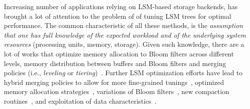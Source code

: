
 Increasing number of applications relying on LSM-based storage
    backends, has brought a lot of attention to the problem of  of tuning LSM trees for optimal performance.     
The common characteristic of all these methods, is the \emph{assumption that one has full knowledge of
the expected workload and of
the underlying system 
    resources} (processing units, memory, storage).
    Given such knowledge, there are a lot of works that optimize memory allocation to Bloom filters across different levels, 
memory distribution between buffers and Bloom filters and merging policies (i.e.,  \emph{leveling} or \emph{tiering})~\cite{Dayan2017,Dayan2018a}.  
Further LSM optimization efforts have lead to
hybrid merging policies to allow for more fine-grained 
tunings~\cite{Dayan2018,Dayan2019,Idreos2019}, optimized memory allocation 
strategies~\cite{Bortnikov2018,Kim2020,Luo2020a}, variations of Bloom 
filters~\cite{Luo2020,Zhang2018a,Zhang2020a}, new compaction 
routines~\cite{Alkowaileet2020,Luo2019a,Sarkar2020,Zhang2020}, and
exploitation of data characteristics~\cite{Yang2020, Ren2017, Absalyamov2018}.




